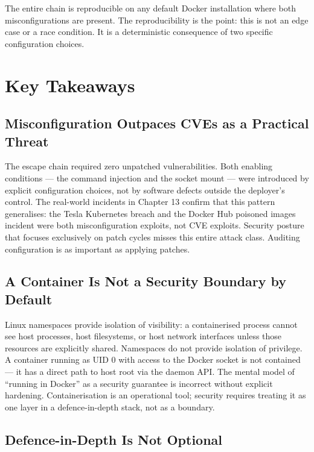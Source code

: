 The entire chain is reproducible on any default Docker installation where both misconfigurations are present. The reproducibility is the point: this is not an edge case or a race condition. It is a deterministic consequence of two specific configuration choices.


\section{Key Takeaways}

\subsection{Misconfiguration Outpaces CVEs as a Practical Threat}

The escape chain required zero unpatched vulnerabilities. Both enabling conditions --- the command injection and the socket mount --- were introduced by explicit configuration choices, not by software defects outside the deployer's control. The real-world incidents in Chapter 13 confirm that this pattern generalises: the Tesla Kubernetes breach and the Docker Hub poisoned images incident were both misconfiguration exploits, not CVE exploits. Security posture that focuses exclusively on patch cycles misses this entire attack class. Auditing configuration is as important as applying patches.

\subsection{A Container Is Not a Security Boundary by Default}

Linux namespaces provide isolation of visibility: a containerised process cannot see host processes, host filesystems, or host network interfaces unless those resources are explicitly shared. Namespaces do not provide isolation of privilege. A container running as UID 0 with access to the Docker socket is not contained --- it has a direct path to host root via the daemon API. The mental model of ``running in Docker'' as a security guarantee is incorrect without explicit hardening. Containerisation is an operational tool; security requires treating it as one layer in a defence-in-depth stack, not as a boundary.

\subsection{Defence-in-Depth Is Not Optional}

